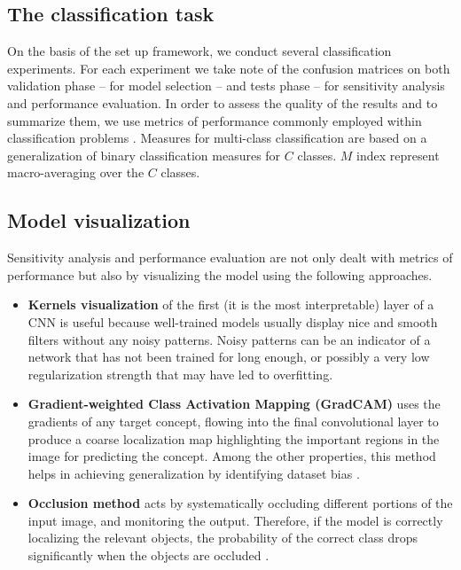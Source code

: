 \subsection{The classification task}
On the basis of the set up framework, we conduct several classification experiments. For each experiment we take note of the confusion matrices on both validation phase -- for model selection -- and tests phase -- for sensitivity analysis and performance evaluation. In order to assess the quality of the results and to summarize them, we use metrics of performance commonly employed within classification problems \cite{ref34}. Measures for multi-class classification are based on a generalization of binary classification measures for $C$ classes. $M$ index represent macro-averaging over the $C$ classes.
\subsection{Model visualization}
Sensitivity analysis and performance evaluation are not only dealt with metrics of performance but also by visualizing the model using the following approaches.
\begin{itemize}
	\item \textbf{Kernels visualization} of the first (it is the most interpretable) layer of a CNN is useful because well-trained models usually display nice and smooth filters without any noisy patterns. Noisy patterns can be an indicator of a network that has not been trained for long enough, or possibly a very low regularization strength that may have led to overfitting.
	\vspace{-5pt}
	\item \textbf{Gradient-weighted Class Activation Mapping (GradCAM)} uses the gradients of any target concept, flowing into the final convolutional layer to produce a coarse localization map highlighting the important regions in the image for predicting the concept. Among the other properties, this method helps in achieving generalization by identifying dataset bias \cite{ref12}.
	\vspace{-5pt}
	\item \textbf{Occlusion method} acts by systematically occluding different portions of the input image, and monitoring the output. Therefore, if the model is correctly localizing the relevant objects, the probability of the correct class drops significantly when the objects are occluded \cite{ref13}.
\end{itemize}